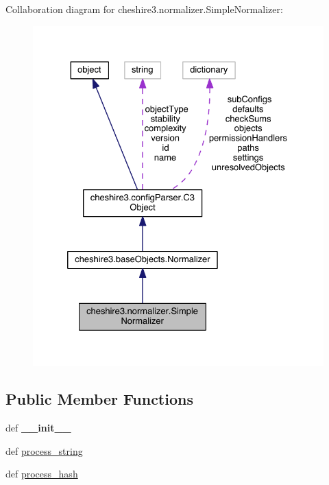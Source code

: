 Collaboration diagram for cheshire3.\-normalizer.\-Simple\-Normalizer\-:
\nopagebreak
\begin{figure}[H]
\begin{center}
\leavevmode
\includegraphics[width=328pt]{classcheshire3_1_1normalizer_1_1_simple_normalizer__coll__graph}
\end{center}
\end{figure}
\subsection*{Public Member Functions}
\begin{DoxyCompactItemize}
\item 
\hypertarget{classcheshire3_1_1normalizer_1_1_simple_normalizer_a10cded4e7a0fe382957a39b423c65e8a}{def {\bfseries \-\_\-\-\_\-init\-\_\-\-\_\-}}\label{classcheshire3_1_1normalizer_1_1_simple_normalizer_a10cded4e7a0fe382957a39b423c65e8a}

\item 
def \hyperlink{classcheshire3_1_1normalizer_1_1_simple_normalizer_adc935f27f6f7cb7abcffea53faa8009f}{process\-\_\-string}
\item 
def \hyperlink{classcheshire3_1_1normalizer_1_1_simple_normalizer_acbe89f4c7d455b4abd176764ae11318a}{process\-\_\-hash}
\end{DoxyCompactItemize}
